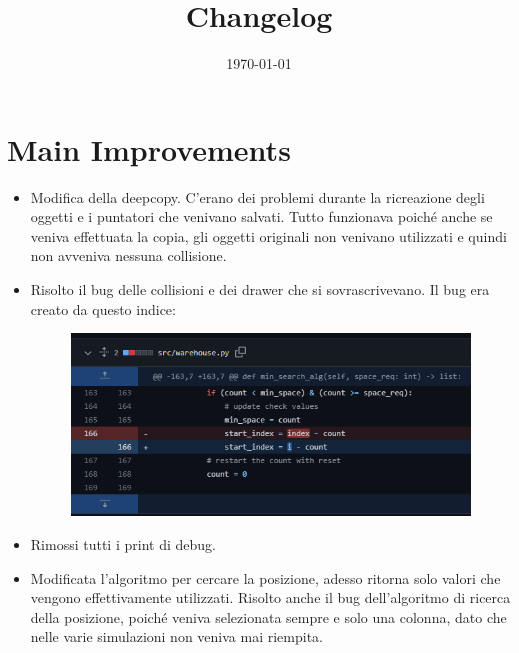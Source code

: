 \documentclass[a4paper]{article}
\begin{document}
	\title{Changelog}
	\date{\today}
	\maketitle
	
	\newpage
	
	\section*{Main Improvements}
	\begin{itemize}[label=]
		\item Modifica della \textsf{deepcopy}. C'erano dei problemi durante la ricreazione degli oggetti e i puntatori che venivano salvati. Tutto funzionava poiché anche se veniva effettuata la copia, gli oggetti originali non venivano utilizzati e quindi non avveniva nessuna collisione.

		\item Risolto il bug delle collisioni e dei drawer che si sovrascrivevano. Il bug era creato da questo indice:
		\begin{figure}[tph!]
			\centering
			\includegraphics[width=\textwidth]{img/screenshot001}
			\label{fig:screenshot001}
		\end{figure}

		\item Rimossi tutti i print di debug.

		\item Modificata l'algoritmo per cercare la posizione, adesso ritorna solo valori che vengono effettivamente utilizzati. Risolto anche il bug dell'algoritmo di ricerca della posizione, poiché veniva selezionata sempre e solo una colonna, dato che nelle varie simulazioni non veniva mai riempita.


\end{itemize}
\end{document}
